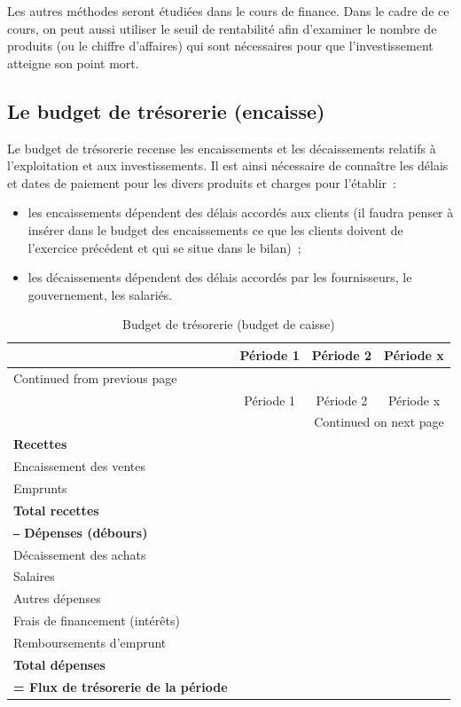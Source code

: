 \documentclass{kaobook}
\begin{document}
Les autres méthodes seront étudiées dans le cours de finance. Dans le cadre de ce cours, on peut aussi utiliser le seuil de rentabilité afin d'examiner le nombre de produits (ou le chiffre d'affaires) qui sont nécessaires pour que l'investissement atteigne son point mort.\\
\subsection{Le budget de trésorerie (encaisse)}
\label{sec:org6a36a18}
Le budget de trésorerie recense les encaissements et les décaissements relatifs à l'exploitation et aux investissements. Il est ainsi nécessaire de connaître les délais et dates de paiement pour les divers produits et charges pour l'établir :\\
\begin{itemize}
\item les encaissements dépendent des délais accordés aux clients (il faudra penser à insérer dans le budget des encaissements ce que les clients doivent de l'exercice précédent et qui se situe dans le bilan) ;\\
\item les décaissements dépendent des délais accordés par les fournisseurs, le gouvernement, les salariés.\\
\end{itemize}

\begin{longtable}{l c c c}
\caption{Budget de trésorerie (budget de caisse)}
\\
 & Période 1 & Période 2 & Période x\\
\hline
\endfirsthead
\multicolumn{4}{l}{Continued from previous page} \\
\hline

 & Période 1 & Période 2 & Période x \\

\hline
\endhead
\hline\multicolumn{4}{r}{Continued on next page} \\
\endfoot
\endlastfoot
\hline
\textbf{Recettes} &  &  & \\
Encaissement des ventes &  &  & \\
Emprunts &  &  & \\
\textbf{Total recettes} &  &  & \\
\textbf{‒ Dépenses (débours)} &  &  & \\
Décaissement des achats &  &  & \\
Salaires &  &  & \\
Autres dépenses &  &  & \\
Frais de financement (intérêts) &  &  & \\
Remboursements d’emprunt &  &  & \\
\textbf{Total dépenses} &  &  & \\
\textbf{= Flux de trésorerie de la période} &  &  & \\
\end{longtable}
\end{document}
